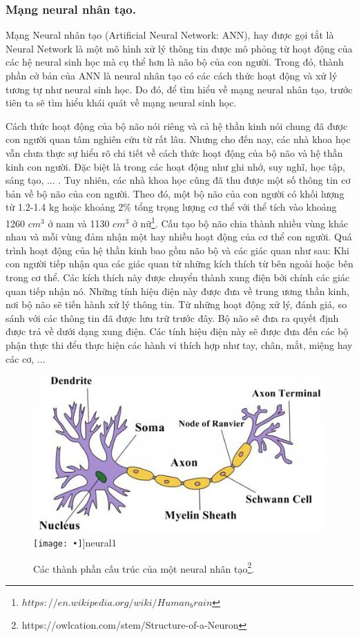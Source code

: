 \subsubsection{Mạng neural nhân tạo.}
Mạng Neural nhân tạo (Artificial Neural Network: ANN), hay được gọi tắt là Neural Network là một mô hình xử lý thông tin được mô phỏng từ hoạt động của các hệ neural sinh học mà cụ thể hơn là não bộ của con người. Trong đó, thành phần cở bản của ANN là neural nhân tạo có các cách thức hoạt động và xử lý tương tự như neural sinh học. Do đó, để tìm hiểu về mạng neural nhân tạo, trước tiên ta sẽ tìm hiểu khái quát về mạng neural sinh học. \par
 	Cách thức hoạt động của bộ não nói riêng và cả hệ thần kinh nói chung đã được con người quan tâm nghiên cứu từ rất lâu. Nhưng cho đến nay, các nhà khoa học vẫn chưa thực sự hiểu rõ chi tiết về cách thức hoạt động của bộ não và hệ thần kinh con người. Đặc biệt là trong các hoạt động như ghi nhớ, suy nghĩ, học tập, sáng tạo, ... . Tuy nhiên, các nhà khoa học cũng đã thu được một số thông tin cơ bản về bộ não của con người. Theo đó, một bộ não của con người có khối lượng từ 1.2-1.4 kg hoặc khoảng 2\% tổng trọng lượng cơ thể với thể tích vào khoảng 1260 $cm^3$ ở nam và 1130 $cm^3$ ở nữ\footnote{$https://en.wikipedia.org/wiki/Human_brain$}. Cấu tạo bộ não chia thành nhiều vùng khác nhau và mỗi vùng đảm nhận một hay nhiều hoạt động của cơ thể con người. Quá trình hoạt động của hệ thần kinh bao gồm não bộ và các giác quan như sau: Khi con người tiếp nhận qua các giác quan từ những kích thích từ bên ngoài hoặc bên trong cơ thể. Các kích thích này được chuyển thành xung điện bởi chính các giác quan tiếp nhận nó. Những tính hiệu điện này được đưa về trung ương thần kinh, nơi bộ não sẽ tiến hành xử lý thông tin. Từ những hoạt động xử lý, đánh giá, so sánh với các thông tin đã được lưu trữ trước đây. Bộ não sẽ đưa ra quyết định được trả về dưới dạng xung điện. Các tính hiệu điện này sẽ được đưa đến các bộ phận thực thi đểu thực hiện các hành vi thích hợp như tay, chân, mắt, miệng hay các cơ, ... \par 
\begin{figure}[ht]
  \begin{center}
    \leavevmode
    \ifpdf
      \includegraphics[scale=.7]{neural1}
    \else
      \texttt{[image: •]}]{neural1}
    \fi
    \caption{Các thành phần cấu trúc của một neural nhân tạo\protect\footnote{https://owlcation.com/stem/Structure-of-a-Neuron}.}
    \label{FigAir}
  \end{center}
\end{figure}
